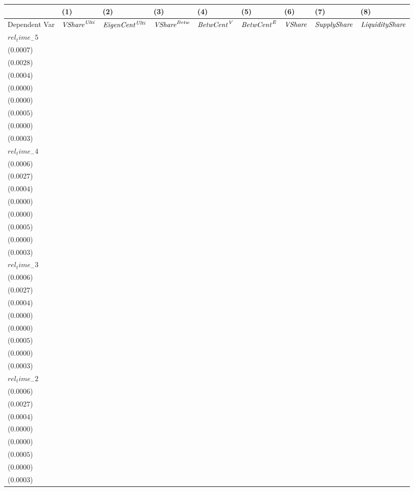 \begin{tabular}{lllllllll}
\toprule
 & (1) & (2) & (3) & (4) & (5) & (6) & (7) & (8) \\
\midrule
Dependent Var & ${\it {VShare}^{\it Ulti}}$ & ${\it EigenCent^{\it Ulti}}$ & ${\it VShare}^{\it Betw}$ & ${\it BetwCent}^{\it V}$ & ${\it BetwCent}^{\it E}$ & ${\it VShare}$ & ${\it SupplyShare}$ & ${\it LiquidityShare}$ \\
$rel_time_-5$ & \makecell{$-0.0001^{}$ \\ ($0.0007$)} & \makecell{$0.0006^{}$ \\ ($0.0028$)} & \makecell{$-0.0025^{***}$ \\ ($0.0004$)} & \makecell{$-0.0002^{***}$ \\ ($0.0000$)} & \makecell{$-0.0001^{***}$ \\ ($0.0000$)} & \makecell{$-0.0004^{}$ \\ ($0.0005$)} & \makecell{$0.0000^{}$ \\ ($0.0000$)} & \makecell{$-0.0010^{***}$ \\ ($0.0003$)} \\
$rel_time_-4$ & \makecell{$-0.0016^{**}$ \\ ($0.0006$)} & \makecell{$-0.0072^{***}$ \\ ($0.0027$)} & \makecell{$-0.0026^{***}$ \\ ($0.0004$)} & \makecell{$-0.0002^{***}$ \\ ($0.0000$)} & \makecell{$-0.0001^{***}$ \\ ($0.0000$)} & \makecell{$-0.0019^{***}$ \\ ($0.0005$)} & \makecell{$0.0000^{}$ \\ ($0.0000$)} & \makecell{$-0.0016^{***}$ \\ ($0.0003$)} \\
$rel_time_-3$ & \makecell{$-0.0008^{}$ \\ ($0.0006$)} & \makecell{$-0.0038^{}$ \\ ($0.0027$)} & \makecell{$0.0001^{}$ \\ ($0.0004$)} & \makecell{$-0.0001^{}$ \\ ($0.0000$)} & \makecell{$-0.0000^{}$ \\ ($0.0000$)} & \makecell{$-0.0009^{*}$ \\ ($0.0005$)} & \makecell{$0.0000^{}$ \\ ($0.0000$)} & \makecell{$-0.0026^{***}$ \\ ($0.0003$)} \\
$rel_time_-2$ & \makecell{$-0.0017^{***}$ \\ ($0.0006$)} & \makecell{$-0.0067^{**}$ \\ ($0.0027$)} & \makecell{$-0.0025^{***}$ \\ ($0.0004$)} & \makecell{$-0.0002^{***}$ \\ ($0.0000$)} & \makecell{$-0.0001^{***}$ \\ ($0.0000$)} & \makecell{$-0.0017^{***}$ \\ ($0.0005$)} & \makecell{$0.0000^{}$ \\ ($0.0000$)} & \makecell{$-0.0031^{***}$ \\ ($0.0003$)} \\

\end{tabular}
